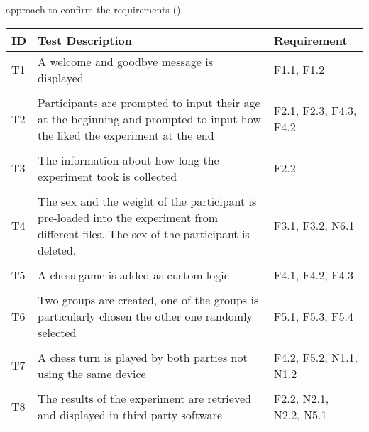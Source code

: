 approach to confirm the requirements (\cite{Sommerville.2011}).

\begin{table}[htbp]
    \centering
    \small
    \begin{tabular}{L{0.04\textwidth}L{0.7\textwidth}L{0.15\textwidth}}
    \hline
    ID  & Test Description                                                                                                                                     & Requirement                  \\ \hline
    T1  & A welcome and goodbye message is displayed                                                                                               & F1.1, F1.2                 \\
    & \\
    T2  & Participants are prompted to input their age at the beginning and prompted to input how the liked the experiment at the end              & F2.1, F2.3, F4.3, F4.2 \\
    & \\
    T3  & The information about how long the experiment took is collected                                                                          & F2.2                         \\
    & \\
    T4  & The sex and the weight of the participant is pre-loaded into the experiment from different files. The sex of the participant is deleted. & F3.1, F3.2, N6.1                         \\
    & \\
    T5  & A chess game is added as custom logic                                                                                                    &  F4.1, F4.2, F4.3         \\
    & \\
    T6  & Two groups are created, one of the groups is particularly chosen the other one randomly selected                                           & F5.1, F5.3, F5.4         \\
    & \\
    T7  & A chess turn is played by both parties not using the same device                                                                         & F4.2, F5.2, N1.1, N1.2         \\
    & \\
    T8  & The results of the experiment are retrieved and displayed in third party software                                                        & F2.2, N2.1, N2.2, N5.1                \\

\end{tabular}
\end{table}
